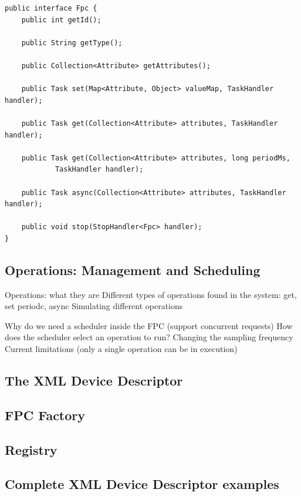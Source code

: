 \lstset{language=java}
\begin{lstlisting}[float,caption=The FPC interface,label={lst:fpc}]
public interface Fpc {
    public int getId();

    public String getType();

    public Collection<Attribute> getAttributes();

    public Task set(Map<Attribute, Object> valueMap, TaskHandler handler);

    public Task get(Collection<Attribute> attributes, TaskHandler handler);

    public Task get(Collection<Attribute> attributes, long periodMs,
            TaskHandler handler);

    public Task async(Collection<Attribute> attributes, TaskHandler handler);

    public void stop(StopHandler<Fpc> handler);
}
\end{lstlisting}

\subsection{Operations: Management and Scheduling}
\label{sec:fpc.operation}

Operations: what they are
Different types of operations found in the system: get, set periodc, async
Simulating different operations

Why do we need a scheduler inside the FPC (support concurrent requests)
How does the scheduler select an operation to run?
Changing the sampling frequency
Current limitations (only a single operation can be in execution)


\subsection{The XML Device Descriptor}

\subsection{FPC Factory}

\subsection{Registry}


\subsection{Complete XML Device Descriptor examples}

